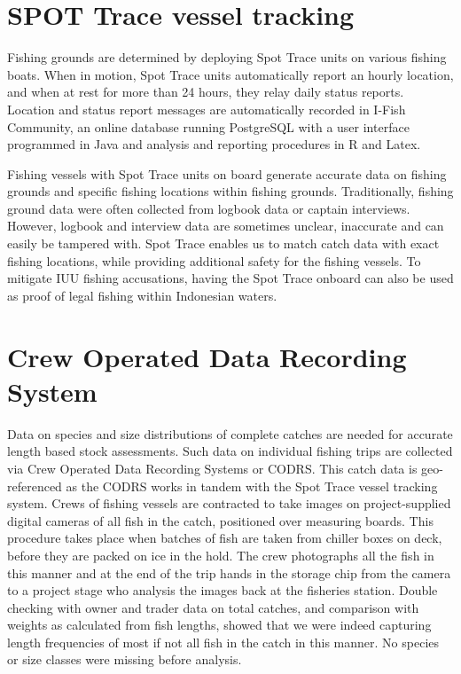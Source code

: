 \section{SPOT Trace vessel tracking}

Fishing grounds are determined by deploying Spot Trace units on various fishing boats. When in motion, Spot Trace units automatically report an hourly location, and when at rest for more than 24 hours, they relay daily status reports. Location and status report messages are automatically recorded in I-Fish Community, an online database running PostgreSQL with a user interface programmed in Java and analysis and reporting procedures in R and Latex.

Fishing vessels with Spot Trace units on board generate accurate data on fishing grounds and specific fishing locations within fishing grounds. Traditionally, fishing ground data were often collected from logbook data or captain interviews. However, logbook and interview data are sometimes unclear, inaccurate and can easily be tampered with. Spot Trace enables us to match catch data with exact fishing locations, while providing additional safety for the fishing vessels. To mitigate IUU fishing accusations, having the Spot Trace onboard can also be used as proof of legal fishing within Indonesian waters.


\section{Crew Operated Data Recording System}

Data on species and size distributions of complete catches are needed for accurate length based stock assessments. Such data on individual fishing trips are collected via Crew Operated Data Recording Systems or CODRS. This catch data is geo-referenced as the CODRS works in tandem with the Spot Trace vessel tracking system. Crews of fishing vessels are contracted to take images on project-supplied digital cameras of all fish in the catch, positioned over measuring boards. This procedure takes place when batches of fish are taken from chiller boxes on deck, before they are packed on ice in the hold. The crew photographs all the fish in this manner and at the end of the trip hands in the storage chip from the camera to a project stage who analysis the images back at the fisheries station. Double checking with owner and trader data on total catches, and comparison with weights as calculated from fish lengths, showed that we were indeed capturing length frequencies of most if not all fish in the catch in this manner. No species or size classes were missing before analysis.

